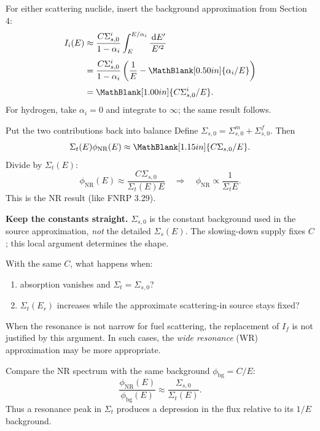 \begin{handoutcolumns}
For either scattering nuclide, insert the background approximation from Section 4:
\begin{align*}
 I_i(E)
 &\approx \frac{C\Sigma_{s,0}^i}{1-\alpha_i}
    \int_E^{E/\alpha_i}\frac{\dd E'}{E'^2}\\[3pt]
 &=\frac{C\Sigma_{s,0}^i}{1-\alpha_i}
    \left(\frac{1}{E}-\MathBlank[0.50in]{\alpha_i/E}\right)\\[3pt]
 &=\MathBlank[1.00in]{C\Sigma_{s,0}^i/E}.
\end{align*}
For hydrogen, take $\alpha_i=0$ and integrate to $\infty$; the same result follows.

\begin{boardbox}{Put the two contributions back into balance}
Define $\Sigma_{s,0}=\Sigma_{s,0}^m+\Sigma_{s,0}^f$. Then
$$
 \Sigma_t(E)\phi_{\mathrm{NR}}(E)
 \approx \MathBlank[1.15in]{C\Sigma_{s,0}/E}.
$$
Divide by $\Sigma_t(E)$:
$$
 \boxed{\phi_{\mathrm{NR}}(E)\approx
 \frac{C\Sigma_{s,0}}{\Sigma_t(E)E}}
 \quad\Longrightarrow\quad
 \boxed{\phi_{\mathrm{NR}}\propto\frac{1}{\Sigma_t E}}.
$$
This is the NR result (like FNRP 3.29).
\end{boardbox}

\textbf{Keep the constants straight.} $\Sigma_{s,0}$ is the constant background used in the source approximation, \emph{not} the detailed $\Sigma_s(E)$. The slowing-down supply fixes $C$; this local argument determines the shape.

\begin{checkpoint}
With the same $C$, what happens when:
\begin{enumerate}
\item absorption vanishes and $\Sigma_t=\Sigma_{s,0}$?
\item $\Sigma_t(E_r)$ increases while the approximate scattering-in source stays fixed?
\end{enumerate}

\end{checkpoint}

\begin{takeawaybox}
When the resonance is not narrow for fuel scattering, the replacement of $I_f$ is not justified by this argument. In such cases, the {\it wide resonance} (WR) approximation may be more appropriate.
\end{takeawaybox}

\switchcolumn
\RaggedRight
{}
Compare the NR spectrum with the same background $\phi_{\mathrm{bg}}=C/E$:
$$
 \boxed{\frac{\phi_{\mathrm{NR}}(E)}{\phi_{\mathrm{bg}}(E)}
 \approx\frac{\Sigma_{s,0}}{\Sigma_t(E)}}.
$$
Thus a resonance peak in $\Sigma_t$ produces a depression in the flux relative to its $1/E$ background.


\end{handoutcolumns}
